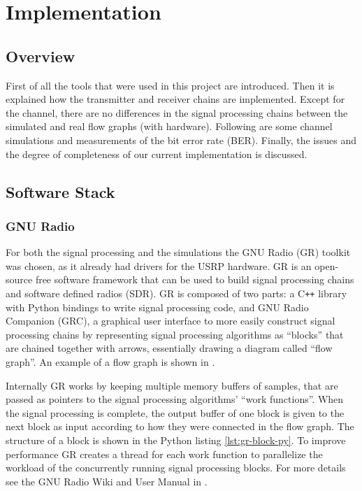 
\chapter{Implementation}

\section{Overview}

First of all the tools that were used in this project are introduced. Then it is explained how the transmitter and receiver chains are implemented. Except for the channel, there are no differences in the signal processing chains between the simulated and real flow graphs (with hardware). Following are some channel simulations and measurements of the bit error rate (BER). Finally, the issues and the degree of completeness of our current implementation is discussed.

\section{Software Stack}

\subsection{GNU Radio}

For both the signal processing and the simulations the GNU Radio (GR) toolkit was chosen, as it already had drivers for the USRP hardware. GR is an open-source free software framework that can be used to build signal processing chains and software defined radios (SDR). GR is composed of two parts: a C\texttt{++} library with Python bindings to write signal processing code, and GNU Radio Companion (GRC), a graphical user interface to more easily construct signal processing chains by representing signal processing algorithms as ``blocks'' that are chained together with arrows, essentially drawing a diagram called ``flow graph''. An example of a flow graph is shown in .

Internally GR works by keeping multiple memory buffers of samples, that are passed as pointers to the signal processing algorithms' ``work functions''. When the signal processing is complete, the output buffer of one block is given to the next block as input according to how they were connected in the flow graph. The structure of a block is shown in the Python listing \ref{lst:gr-block-py}. To improve performance GR creates a thread for each work function to parallelize the workload of the concurrently running signal processing blocks. For more details see the GNU Radio Wiki and User Manual in \cite{GRWiki}.

